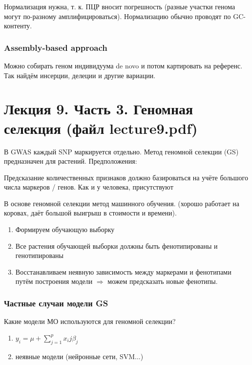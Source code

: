 \documentclass[main.tex]{subfiles}
\begin{document}
Нормализация нужна, т. к. ПЦР вносит погрешность (разные участки генома могут по-разному амплифицироваться).
Нормализацию обычно проводят по GC-контенту.

\subsubsection{Assembly-based approach}

Можно собирать геном индивидуума de novo и потом картировать на референс.
Так найдём инсерции, делеции и другие вариации.

\section{Лекция 9. Часть 3. Геномная селекция (файл lecture9.pdf)}

В GWAS каждый SNP маркируется отдельно.
Метод геномной селекции (GS) предназначен для растений.
Предположения:

Предсказание количественных признаков должно базироваться на учёте большого числа маркеров / генов.
Как и у человека, присутствуют

В основе геномной селекции метод машинного обучения.
(хорошо работает на коровах, даёт большой выигрыш в стоимости и времени).

\begin{enumerate}[noitemsep]
    \item Формируем обучающую выборку
    \item Все растения обучающей выборки должны быть фенотипированы и генотипированы
    \item Восстанавливаем неявную зависимость между маркерами и фенотипами путём построения модели $ \Rightarrow $ можем предсказать новые фенотипы.
\end{enumerate}

\subsubsection{ Частные случаи модели GS }

Какие модели МО используются для геномной селекции?

\begin{enumerate}[noitemsep]
    \item $ y_i = \mu + \sum_{j=1}^{p} x_ij \beta_j $
    \item неявные модели (нейронные сети, SVM...)
\end{enumerate}
\end{document}
